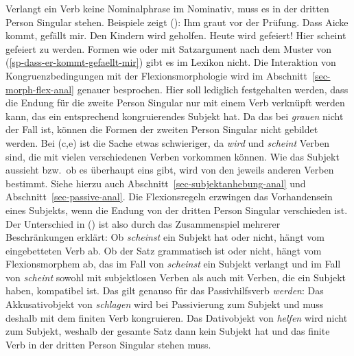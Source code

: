 Verlangt ein Verb keine Nominalphrase im Nominativ, muss es in der dritten Person Singular stehen.
Beispiele zeigt ():
\eal
\ex Ihm graut vor der Prüfung.
\ex\label{sp-dass-er-kommt-gefaellt-mir}
Dass Aicke kommt, gefällt mir.
\ex Den Kindern wird geholfen.
\ex Heute wird gefeiert!
\ex Hier scheint gefeiert zu werden.\label{bsp-scheint-gefeiert-zu-werden}
\zl
Formen wie  oder  mit Satzargument nach dem Muster von
(\ref{sp-dass-er-kommt-gefaellt-mir}) gibt es im Lexikon nicht. 
Die Interaktion von Kongruenzbedingungen mit der Flexionsmorphologie wird 
im Abschnitt~\ref{sec-morph-flex-anal} genauer besprochen. Hier soll lediglich festgehalten werden,
dass \zb die Endung für die zweite Person Singular nur mit einem Verb verknüpft
werden kann, das ein entsprechend kongruierendes Subjekt hat. Da das bei \emph{grauen} nicht der Fall
ist, können die Formen der zweiten Person Singular nicht gebildet werden.
Bei (c,e) ist die Sache etwas schwieriger, da \emph{wird} und \emph{scheint} Verben sind,
die mit vielen verschiedenen Verben vorkommen können. Wie das Subjekt aussieht bzw.\ ob es überhaupt
eins gibt, wird von den jeweils anderen Verben bestimmt.
Siehe hierzu auch Abschnitt~\ref{sec-subjektanhebung-anal} und Abschnitt~\ref{sec-passive-anal}.
Die Flexionsregeln erzwingen
das Vorhandensein eines Subjekts, wenn die Endung von der dritten Person Singular verschieden
ist. Der Unterschied in () ist also durch das Zusammenspiel mehrerer Beschränkungen
erklärt: Ob \emph{scheinst} ein Subjekt hat oder nicht, hängt vom eingebetteten Verb ab.
Ob der Satz grammatisch ist oder nicht, hängt vom Flexionsmorphem ab, das im Fall
von \emph{scheinst} ein Subjekt verlangt und im Fall von \emph{scheint} sowohl mit
subjektlosen Verben als auch mit Verben, die ein Subjekt haben, kompatibel ist.
\eal
{}
\zl
Das gilt genauso für das Passivhilfsverb \emph{werden}:
\eal\label{bsp-kongruenz-passiv}
\zl
Das Akkusativobjekt von \emph{schlagen} wird bei Passivierung zum
Subjekt und muss deshalb mit dem finiten Verb kongruieren. Das Dativobjekt
von \emph{helfen} wird nicht zum Subjekt, weshalb der gesamte Satz
dann kein Subjekt hat und das finite Verb in der dritten Person Singular
stehen muss.

